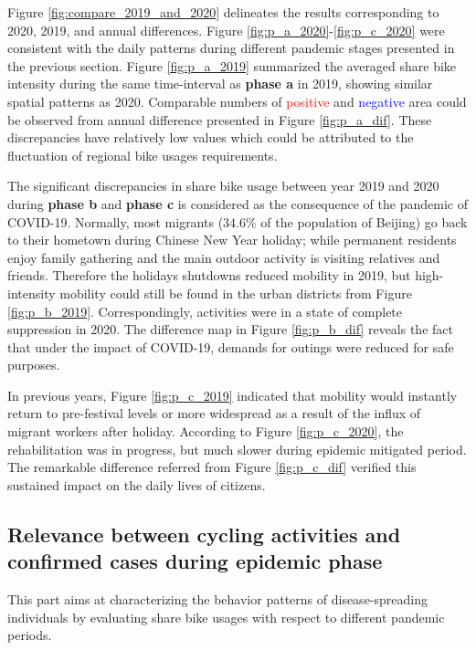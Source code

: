 \documentclass[preprints,ijgi,submit,moreauthors]{Definitions/mdpi}
\begin{document}
Figure \ref{fig:compare_2019_and_2020} delineates the results corresponding to 2020, 2019, and annual differences.
Figure \ref{fig:p_a_2020}-\ref{fig:p_c_2020} were consistent with the daily patterns during different pandemic stages presented in the previous section.
Figure \ref{fig:p_a_2019} summarized the averaged share bike intensity during the same time-interval as \textbf{phase a} in 2019, showing similar spatial patterns as 2020. 
Comparable numbers of \textcolor{red}{positive} and \textcolor{blue}{negative} area could be observed from annual difference presented in Figure \ref{fig:p_a_dif}. These discrepancies have relatively low values which could be attributed to the fluctuation of regional bike usages requirements.  

The significant discrepancies in share bike usage between year 2019 and 2020 during \textbf{phase b} and \textbf{phase c} is considered as the consequence of the pandemic of COVID-19. 
Normally, most migrants ($34.6\%$ of the population of Beijing) go back to their hometown during Chinese New Year holiday; while permanent residents enjoy family gathering and the main outdoor activity is visiting relatives and friends.
Therefore the holidays shutdowns reduced mobility in 2019, but high-intensity mobility could still be found in the urban districts from Figure \ref{fig:p_b_2019}. 
Correspondingly, activities were in a state of complete suppression in 2020. 
The difference map in Figure \ref{fig:p_b_dif} reveals the fact that under the impact of COVID-19, demands for outings were reduced for safe purposes.

In previous years, Figure \ref{fig:p_c_2019} indicated that mobility would instantly return to pre-festival levels or more widespread as a result of the influx of migrant workers after holiday.
According to Figure \ref{fig:p_c_2020}, the rehabilitation was in progress, but much slower during epidemic mitigated period.
The remarkable difference referred from Figure \ref{fig:p_c_dif} verified this sustained impact on the daily lives of citizens.

\subsection{Relevance between cycling activities and confirmed cases during epidemic phase} 

This part aims at characterizing the behavior patterns of disease-spreading individuals by evaluating share bike usages with respect to different pandemic periods.%
\end{document}
